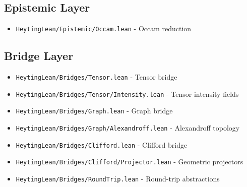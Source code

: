 \documentclass{amsart}
\theoremstyle{definition}
\theoremstyle{remark}
\begin{document}
\subsection{Epistemic Layer}
\begin{itemize}
\item \texttt{HeytingLean/Epistemic/Occam.lean} - Occam reduction
\end{itemize}

\subsection{Bridge Layer}
\begin{itemize}
\item \texttt{HeytingLean/Bridges/Tensor.lean} - Tensor bridge
\item \texttt{HeytingLean/Bridges/Tensor/Intensity.lean} - Tensor intensity fields
\item \texttt{HeytingLean/Bridges/Graph.lean} - Graph bridge
\item \texttt{HeytingLean/Bridges/Graph/Alexandroff.lean} - Alexandroff topology
\item \texttt{HeytingLean/Bridges/Clifford.lean} - Clifford bridge
\item \texttt{HeytingLean/Bridges/Clifford/Projector.lean} - Geometric projectors
\item \texttt{HeytingLean/Bridges/RoundTrip.lean} - Round-trip abstractions
\end{itemize}
\end{document}
